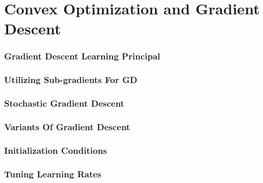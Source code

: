 \chapter{Convex Optimization and Gradient Descent}
    \subsection{Gradient Descent Learning Principal}
    \subsection{Utilizing Sub-gradients For GD}
    \subsection{Stochastic Gradient Descent}
    \subsection{Variants Of Gradient Descent}
        \subsection{Initialization Conditions}
        \subsection{Tuning Learning Rates}
